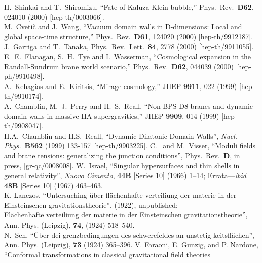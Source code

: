 \documentclass[a4paper,10pt]{article}
\begin{document}
\begin{thebibliography}{99}
H.~Shinkai and T.~Shiromizu,
``Fate of Kaluza-Klein bubble,''
Phys.\ Rev.\  {\bf D62}, 024010 (2000)
[hep-th/0003066].
\\
M.~Cveti\v{c} and J.~Wang,
``Vacuum domain walls in D-dimensions: Local and global space-time  structure,''
Phys.\ Rev.\  {\bf D61}, 124020 (2000)
[hep-th/9912187].
\\
J.~Garriga and T.~Tanaka,
Phys.\ Rev.\ Lett.\  {\bf 84}, 2778 (2000)
[hep-th/9911055].
\\
E.~E.~Flanagan, S.~H.~Tye and I.~Wasserman,
``Cosmological expansion in the Randall-Sundrum brane world scenario,''
Phys.\ Rev.\  {\bf D62}, 044039 (2000)
[hep-ph/9910498].
\\
A.~Kehagias and E.~Kiritsis,
``Mirage cosmology,''
JHEP {\bf 9911}, 022 (1999)
[hep-th/9910174].
\\
A.~Chamblin, M.~J.~Perry and H.~S.~Reall,
``Non-BPS D8-branes and dynamic domain walls in massive IIA  supergravities,''
JHEP {\bf 9909}, 014 (1999)
[hep-th/9908047].
\\
H.A.~Chamblin and H.S.~Reall, 
``Dynamic Dilatonic Domain Walls'',
{\it Nucl.  Phys.}\ {\bf B562} (1999) 133-157
[hep-th/9903225].
C.~{\Barcelo} and M.~Visser,
``Moduli fields and brane tensions: generalizing the junction conditions'',
Phys.\ Rev.\  {\bf D}, in press,
[gr-qc/0008008].
W.~Israel,
``Singular hypersurfaces and thin shells in general relativity'',
{\em Nuovo Cimento}, {\bf 44B} [Series 10] (1966) 1--14; 
Errata---{\em ibid} {\bf 48B} [Series 10] (1967) 463--463.
\\
K. Lanczos,
``Untersuching \"uber fl\"achenhafte verteiliung der materie in der 
Einsteinschen gravitationstheorie'', (1922), unpublished;
\\
Fl\"achenhafte verteiliung der materie in der Einsteinschen gravitationstheorie'', 
Ann. Phys. (Leipzig), {\bf 74}, (1924) 518--540.
\\
N.~Sen, 
``\"Uber dei grenzbedingungen des schwerefeldes an unstetig keitsfl\"achen'',
Ann. Phys. (Leipzig), {\bf 73} (1924) 365--396.
V. Faraoni, E. Gunzig, and P. Nardone, 
``Conformal transformations in classical gravitational field theories

\end{thebibliography}
\end{document}
